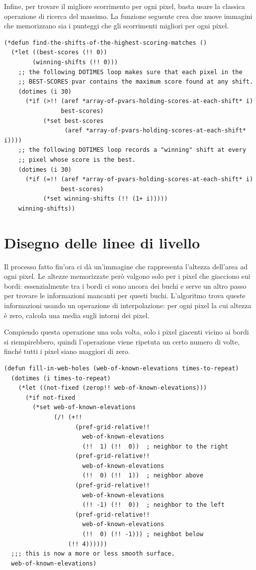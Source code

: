 \documentclass[12pt,a4paper,openright,twoside]{report}
\begin{document}
Infine, per trovare il migliore scorrimento per ogni pixel, basta usare la classica operazione di ricerca del massimo. La funzione seguente crea due nuove immagini che memorizzano sia i punteggi che gli scorrimenti migliori per ogni pixel.

\begin{lstlisting}[style=mystyle]
(*defun find-the-shifts-of-the-highest-scoring-matches ()
  (*let ((best-scores (!! 0))
        (winning-shifts (!! 0)))
    ;; the following DOTIMES loop makes sure that each pixel in the
    ;; BEST-SCORES pvar contains the maximum score found at any shift.
    (dotimes (i 30)
      (*if (>!! (aref *array-of-pvars-holding-scores-at-each-shift* i)
                best-scores)
           (*set best-scores
                 (aref *array-of-pvars-holding-scores-at-each-shift* i))))
    ;; the following DOTIMES loop records a "winning" shift at every
    ;; pixel whose score is the best.
    (dotimes (i 30)
      (*if (=!! (aref *array-of-pvars-holding-scores-at-each-shift* i)
                best-scores)
           (*set winning-shifts (!! (1+ i)))))
    winning-shifts))
\end{lstlisting}

\section{Disegno delle linee di livello}

Il processo fatto fin'ora ci dà un'immagine che rappresenta l'altezza dell'area ad ogni pixel. Le altezze memorizzate però valgono solo per i pixel che giacciono sui bordi: essenzialmente tra i bordi ci sono ancora dei buchi e serve un altro passo per trovare le informazioni mancanti per questi buchi. L'algoritmo trova queste informazioni usando un operazione di interpolazione: per ogni pixel la cui altezza è zero, calcola una media sugli intorni dei pixel.

Compiendo questa operazione una sola volta, solo i pixel giacenti vicino ai bordi si riempirebbero, quindi l'operazione viene ripetuta un certo numero di volte, finché tutti i pixel siano maggiori di zero.

\begin{lstlisting}[style=mystyle]
(defun fill-in-web-holes (web-of-known-elevations times-to-repeat)
  (dotimes (i times-to-repeat)
    (*let ((not-fixed (zerop!! web-of-known-elevations)))
      (*if not-fixed
        (*set web-of-known-elevations
              (/! (+!!
                    (pref-grid-relative!!
                      web-of-known-elevations
                      (!!  1) (!!  0))  ; neighbor to the right
                    (pref-grid-relative!!
                      web-of-known-elevations
                      (!!  0) (!!  1))  ; neighbor above
                    (pref-grid-relative!!
                      web-of-known-elevations
                      (!! -1) (!!  0))  ; neighbor to the left
                    (pref-grid-relative!!
                      web-of-known-elevations
                      (!!  0) (!! -1))) ; neighbot below
                  (!! 4))))))
  ;;; this is now a more or less smooth surface.
  web-of-known-elevations)
\end{lstlisting}
\end{document}
